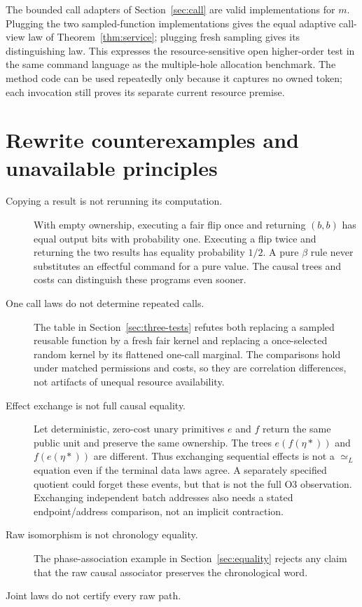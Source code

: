 \documentclass[11pt,a4paper]{article}
\theoremstyle{definition}
\begin{document}
The bounded call adapters of Section~\ref{sec:call} are valid implementations
for $m$. Plugging the two sampled-function implementations gives the equal
adaptive call-view law of Theorem~\ref{thm:service}; plugging fresh sampling
gives its distinguishing law. This expresses the resource-sensitive open
higher-order test in the same command language as the multiple-hole
allocation benchmark. The method code can be used repeatedly only because
it captures no owned token; each invocation still proves its separate
current resource premise.

\section{Rewrite counterexamples and unavailable principles}\label{sec:rewrites}
\begin{description}
\item[Copying a result is not rerunning its computation.]
With empty ownership, executing a fair flip once and returning $(b,b)$
has equal output bits with probability one. Executing a flip twice and
returning the two results has equality probability $1/2$. A pure
$\beta$ rule never substitutes an effectful command for a pure value.
The causal trees and costs can distinguish these programs even sooner.
\item[One call laws do not determine repeated calls.]
The table in Section~\ref{sec:three-tests} refutes both replacing a sampled
reusable function by a fresh fair kernel and replacing a once-selected
random kernel by its flattened one-call marginal. The comparisons hold
under matched permissions and costs, so they are correlation differences,
not artifacts of unequal resource availability.
\item[Effect exchange is not full causal equality.]
Let deterministic, zero-cost unary primitives $e$ and $f$ return the same
public unit and preserve the same ownership. The trees
$e(f(\eta *))$ and $f(e(\eta *))$ are different. Thus exchanging sequential
effects is not a $\simeq_L$ equation even if the terminal data laws agree.
A separately specified quotient could forget these events, but that is
not the full O3 observation. Exchanging independent batch addresses also
needs a stated endpoint/address comparison, not an implicit contraction.
\item[Raw isomorphism is not chronology equality.]
The phase-association example in Section~\ref{sec:equality} rejects any
claim that the raw causal associator preserves the chronological word.
\item[Joint laws do not certify every raw path.]

\end{description}
\end{document}
